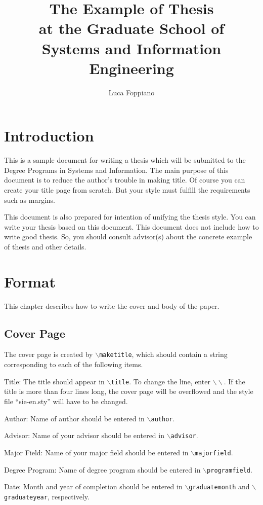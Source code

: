 \documentclass[12pt, a4paper]{report}
\title{The Example of Thesis \\ at the Graduate School of \\ Systems and Information Engineering}
\author{Luca Foppiano}
\begin{document}
\maketitle
\makeabstract
\maketableofcontents


\chapter{Introduction}

This is a sample document for writing a thesis which will be submitted to the Degree
Programs in Systems and Information. The main purpose of this document is to reduce
the author's trouble in making title. Of course you can create your title page from
scratch. But your style must fulfill the requirements such as margins.

This document is also prepared for intention of unifying the thesis style. You can
write your thesis based on this document. This document does not include how to
write good thesis. So, you should consult advisor(s) about the concrete example of thesis
and other details.

\chapter{Format}

This chapter describes how to write the cover and body of the paper.

\section{Cover Page}

The cover page is created by {\tt $\backslash$maketitle}, which should
contain a string corresponding to each of the following items.


\begin{description} \parskip=1pt
\item{Title:}
  The title should appear in {\tt $\backslash$title}.  To change the line, enter $\backslash\backslash$.
  If the title is more than four lines long, the cover page will be overflowed and the style file ``sie-en.sty'' will have to be changed.
\item{Author:}
  Name of author should be entered in {\tt $\backslash$author}.
\item{Advisor:}
  Name of your advisor should be entered in {\tt $\backslash$advisor}.
\item{Major Field:}
  Name of your major field should be entered in {\tt $\backslash$majorfield}.
\item{Degree Program:}
  Name of degree program should be entered in {\tt $\backslash$programfield}.
\item{Date:}
  Month and year of completion should be entered in {\tt $\backslash$graduatemonth} and {\tt $\backslash$graduateyear}, respectively. 
\end{description}
\end{document}

